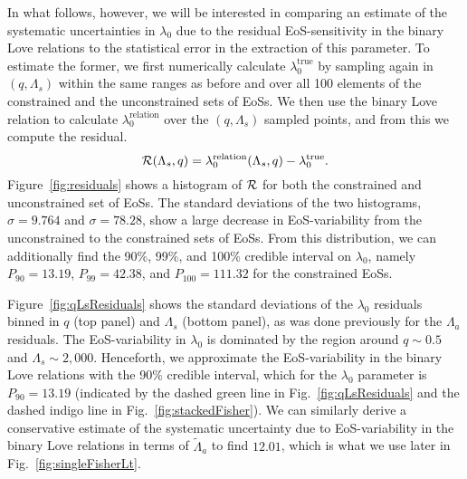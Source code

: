 \documentclass[prd,twocolumn,nofootinbib,superscriptaddress,amsmath,amssymb]{revtex4-1}
\begin{document}
In what follows, however, we will be interested in comparing an estimate of the systematic uncertainties in $\lambda_0$ due to the residual EoS-sensitivity in the binary Love relations to the statistical error in the extraction of this parameter. To estimate the former, we first numerically calculate $\lambda_{0}^{\textrm{true}}$ by sampling again in $(q,\Lambda_{s})$ within the same ranges as before and over all 100 elements of the constrained and the unconstrained sets of EoSs. We then use the binary Love relation to calculate $\lambda_0^{\text{relation}}$ over the $(q,\Lambda_{s})$ sampled points, and from this we compute the residual.  
\begin{equation}
{\cal{R}}(\Lambda_{s},q) = \lambda_0^{\text{relation}}(\Lambda_s,q)-\lambda_0^{\text{true}}.
\end{equation}
Figure~\ref{fig:residuals} shows a histogram of ${\cal{R}}$ for both the constrained and unconstrained set of EoSs. The standard deviations of the two histograms, $\sigma=9.764$ and $\sigma=78.28$, show a large decrease in EoS-variability from the unconstrained to the constrained sets of EoSs. From this distribution, we can additionally find the 90\%, 99\%, and 100\% credible interval on $\lambda_0$, namely $P_{90}=13.19$, $P_{99}=42.38$, and $P_{100}=111.32$ for the constrained EoSs.

Figure~\ref{fig:qLsResiduals} shows the standard deviations of the $\lambda_0$ residuals binned in $q$ (top panel) and $\Lambda_{s}$ (bottom panel), as was done previously for the $\Lambda_a$ residuals. The EoS-variability in $\lambda_0$ is dominated by the region around $q \sim 0.5$ and $\Lambda_{s} \sim 2,000$. Henceforth, we approximate the EoS-variability in the binary Love relations with the 90\% credible interval, which for the $\lambda_{0}$ parameter is $P_{90}=13.19$ (indicated by the dashed green line in Fig.~\ref{fig:qLsResiduals} and the dashed indigo line in Fig.~\ref{fig:stackedFisher}). We can similarly derive a conservative estimate of the systematic uncertainty due to EoS-variability in the binary Love relations in terms of $\tilde\Lambda_{a}$ to find $12.01$, which is what we use later in Fig.~\ref{fig:singleFisherLt}.
\end{document}
